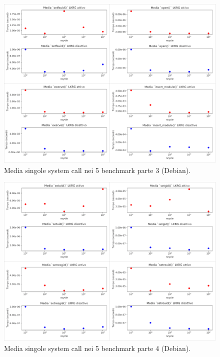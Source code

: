 \clearpage

\begin{figure}[!htbp]
\centering
\includegraphics[scale=1.3]{Figures/Debian/Mean3}
\caption[Media singole system call nei 5 benchmark parte 3 (Debian)]{Media singole system call nei 5 benchmark parte 3 (Debian).}
\label{fig:mean3DebianFig}
\end{figure}

\begin{figure}[!htbp]
\centering
\includegraphics[scale=1.3]{Figures/Debian/Mean4}
\caption[Media singole system call nei 5 benchmark parte 4 (Debian)]{Media singole system call nei 5 benchmark parte 4 (Debian).}
\label{fig:mean4DebianFig}
\end{figure}

